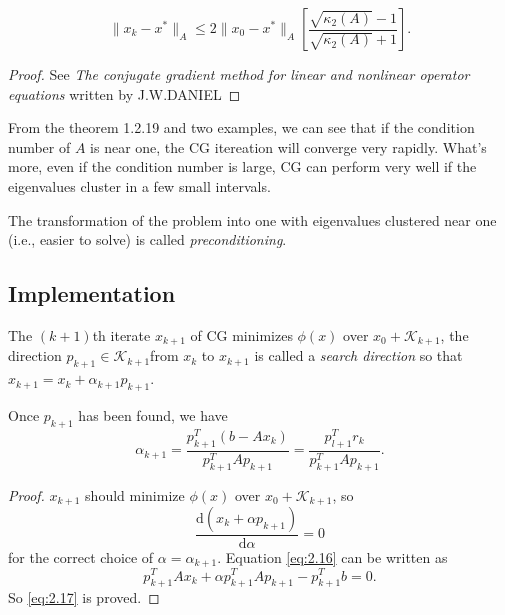 \begin{thm}
 $$\|x_k-x^*\|_A\leq
 2\|x_0-x^*\|_A\left[\frac{\sqrt{\kappa_2(A)}-1}{\sqrt{\kappa_2(A)}+1}\right].$$
\end{thm}
\begin{proof}
  See \emph{The conjugate gradient method for linear and nonlinear
    operator equations} written by J.W.DANIEL
\end{proof}

\begin{rmk}
  From the theorem 1.2.19 and two examples, we can see that if the
  condition number of 
  $A$ is near one, the CG itereation will converge very
  rapidly. What's more,  even if the condition number is large, CG can
  perform very well if the eigenvalues cluster in a few small  intervals.
\end{rmk}

\begin{defi}
  The transformation of the problem into one with eigenvalues
  clustered near one (i.e., easier to solve) is called \emph{preconditioning}.
\end{defi}


\subsection{Implementation}
\label{sec:2.4}

\begin{defi}
  The $(k+1)$th iterate $x_{k+1}$ of CG minimizes $\phi(x)$ over
  $x_0+\mathcal{K}_{k+1}$, the direction
  $p_{k+1}\in\mathcal{K}_{k+1}$from $x_k$ to $x_{k+1}$ is
  called  a \emph{search direction} so that $x_{k+1}=x_k+\alpha_{k+1}p_{k+1}.$
\end{defi}

\begin{lemma}
  Once $p_{k+1}$ has been found, we have
  \begin{equation}
    \label{eq:2.17}
    \alpha_{k+1}=\frac{p_{k+1}^T(b-Ax_k)}{p_{k+1}^TAp_{k+1}}=
    \frac{p_{l+1}^Tr_k}{p_{k+1}^TAp_{k+1}}.
  \end{equation}
\end{lemma}

\begin{proof}
  $x_{k+1}$ should minimize $\phi(x)$ over $x_0+\mathcal{K}_{k+1}$, so
  \begin{equation}
    \label{eq:2.16}
    \frac{\mathrm{d}(x_k+\alpha p_{k+1})}{\mathrm{d}\alpha} = 0
  \end{equation}
  for the correct choice of $\alpha=\alpha_{k+1}$. Equation
  \eqref{eq:2.16} can be written as
  $$p_{k+1}^TAx_k+\alpha p_{k+1}^TAp_{k+1}-p_{k+1}^Tb=0.$$
  So \eqref{eq:2.17} is proved.
\end{proof}

